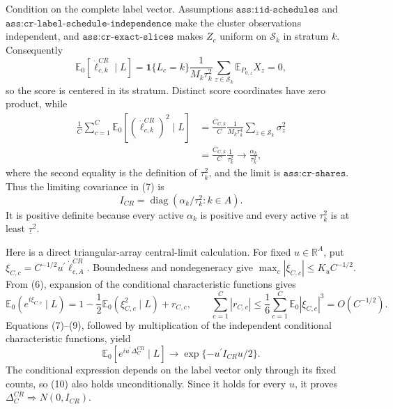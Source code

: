 Condition on the complete label vector.  Assumptions \(\texttt{ass:iid-schedules}\) and \(\texttt{ass:cr-label-schedule-independence}\) make the cluster observations independent, and \(\texttt{ass:cr-exact-slices}\) makes \(Z_c\) uniform on \(\mathcal S_k\) in stratum \(k\).  Consequently
\[
 \mathbb E_0[\dot\ell_{c,k}^{CR}\mid L]
 =\mathbf1\{L_c=k\}\frac1{M_k\tau_k^2}
   \sum_{z\in\mathcal S_k}\mathbb E_{P_{0,z}}X_z=0,            \tag{6}
\]
so the score is centered in its stratum.  Distinct score coordinates have zero product, while
\[
 \begin{aligned}
 \frac1C\sum_{c=1}^C
 \mathbb E_0[(\dot\ell_{c,k}^{CR})^2\mid L]
 &=\frac{C_{C,k}}C\frac1{M_k\tau_k^4}
   \sum_{z\in\mathcal S_k}\sigma_z^2\\
 &=\frac{C_{C,k}}C\frac1{\tau_k^2}
 \longrightarrow\frac{\alpha_k}{\tau_k^2},
 \end{aligned}                                                   \tag{7}
\]
where the second equality is the definition of \(\tau_k^2\), and the limit is \(\texttt{ass:cr-shares}\).  Thus the limiting covariance in (7) is
\[
 I_{CR}=\operatorname{diag}(\alpha_k/\tau_k^2:k\in A).           \tag{8}
\]
It is positive definite because every active \(\alpha_k\) is positive and every active \(\tau_k^2\) is at least \(\underline\tau^2\).

Here is a direct triangular-array central-limit calculation.  For fixed \(u\in\mathbb R^A\), put
\(\xi_{C,c}=C^{-1/2}u^{\prime}\dot\ell_{c,A}^{CR}\).  Boundedness and nondegeneracy give \(\max_c|\xi_{C,c}|\leq K_uC^{-1/2}\).  From (6), expansion of the conditional characteristic functions gives
\[
 \mathbb E_0(e^{i\xi_{C,c}}\mid L)
 =1-\frac12\mathbb E_0(\xi_{C,c}^2\mid L)+r_{C,c},
 \qquad
 \sum_{c=1}^C|r_{C,c}|\leq
 \frac16\sum_{c=1}^C\mathbb E_0|\xi_{C,c}|^3=O(C^{-1/2}).       \tag{9}
\]
Equations (7)--(9), followed by multiplication of the independent conditional characteristic functions, yield
\[
 \mathbb E_0\!\left[e^{iu^{\prime}\Delta_C^{CR}}\mid L\right]
 \longrightarrow \exp\{-u^{\prime}I_{CR}u/2\}.                 \tag{10}
\]
The conditional expression depends on the label vector only through its fixed counts, so (10) also holds unconditionally.  Since it holds for every \(u\), it proves
\(\Delta_C^{CR}\Rightarrow N(0,I_{CR})\).

